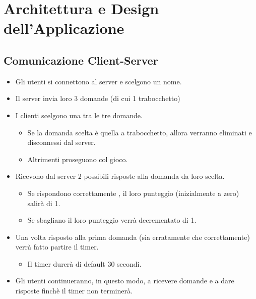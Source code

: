 
\section{Architettura e Design dell'Applicazione} %

\subsection{Comunicazione Client-Server}

\begin{itemize}
	\item \textsf{\normalsize Gli utenti si connettono al server e scelgono un nome.}
	\item \textsf{\normalsize Il server invia loro 3 domande (di cui 1 trabocchetto)}
	\item \textsf{\normalsize I clienti scelgono una tra le tre domande.}
	\begin{itemize}
		\item \textsf{\normalsize Se la domanda scelta è quella a trabocchetto, allora verranno eliminati e disconnessi dal server.}
		\item \textsf{\normalsize Altrimenti proseguono col gioco.}
	\end{itemize}
	\item \textsf{\normalsize Ricevono dal server 2 possibili risposte alla domanda da loro scelta.}
	\begin{itemize}
		\item \textsf{\normalsize Se rispondono correttamente , il loro punteggio (inizialmente a zero) salirà di 1.}
		\item \textsf{\normalsize Se sbagliano il loro punteggio verrà decrementato di 1.} %
	\end{itemize}
	\item \textsf{\normalsize Una volta risposto alla prima domanda (sia erratamente che correttamente) verrà fatto partire il timer.}
	\begin{itemize}
		\item \textsf{\normalsize Il timer durerà di default 30 secondi.}
	\end{itemize}
	\item \textsf{\normalsize Gli utenti continueranno, in questo modo, a ricevere domande e a dare risposte finchè il timer non terminerà.}%

\end{itemize}
